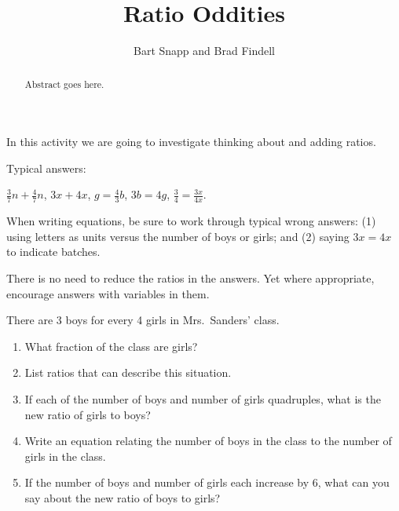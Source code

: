 \documentclass{ximera}
\title{Ratio Oddities}
\author{Bart Snapp and Brad Findell}
\begin{document}
\begin{abstract}
Abstract goes here.  
\end{abstract}
\maketitle

\label{A:ratioOddities}
In this activity we are going to investigate thinking about and adding
ratios.

\begin{teachingnote}
Typical answers:
  
\begin{center}
$\frac{3}{7}n+\frac{4}{7}n$, $3x+4x$, $g=\frac{4}{3}b$, $3b=4g$, $\frac{3}{4} = \frac{3x}{4x}$.
\end{center}

When writing equations, be sure to work through typical wrong answers:  (1) using letters as units versus the number of boys or girls; and (2) saying $3x=4x$ to indicate batches.  

There is no need to reduce the ratios in the answers.  Yet where appropriate, encourage answers with variables in them.

\end{teachingnote}

\begin{problem}
There are 3 boys for every 4 girls in Mrs.\ Sanders' class.
\begin{enumerate}
\item What fraction of the class are girls? 
\item List ratios that can describe this situation. 
\item If each of the number of boys and number of girls quadruples, what is the new ratio of girls to boys?
\item Write an equation relating the number of boys in the class to the number of girls in the class.

\item If the number of boys and number of girls each increase by 6, what can you say about the new ratio of boys to girls?
\end{enumerate}
\end{problem}
\end{document}
